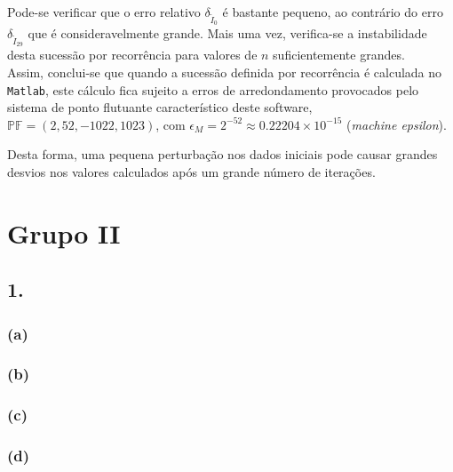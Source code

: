 \documentclass[12pt,a4paper]{article}
\begin{document}
\noindent Pode-se verificar que o erro relativo $\delta_{\tilde{I}_0}$ é bastante pequeno, ao contrário do erro $\delta_{\tilde{I}_{29}}$ que é consideravelmente grande. Mais uma vez, verifica-se a instabilidade desta sucessão por recorrência para valores de $n$ suficientemente grandes.
\\

\noindent Assim, conclui-se que quando a sucessão definida por recorrência é calculada no \texttt{Matlab}, este cálculo fica sujeito a erros de arredondamento provocados pelo sistema de ponto flutuante característico deste software, $\mathbb{PF}=(2,52,-1022,1023)$, com $\epsilon_M=2^{-52}\approx0.22204\times10^{-15}$ (\textit{machine epsilon}).

\noindent Desta forma, uma pequena perturbação nos dados iniciais pode causar grandes desvios nos valores calculados após um grande número de iterações.

    
    \newpage
    \section{Grupo II}
    \subsection{1.}
    \subsubsection{(a)}
    

    
    \newpage
    \subsubsection{(b)}
    

    
    \newpage
    \subsubsection{(c)}
    
        

    \newpage
    \subsubsection{(d)}
    
    
    \newpage
    

    \newpage
    
    
\end{document}
